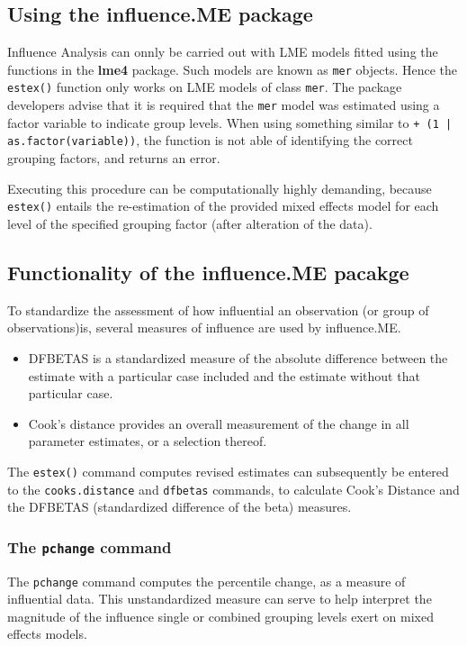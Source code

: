 \documentclass[12pt, a4paper]{article}
\begin{document}
\subsection*{Using the influence.ME package}
Influence Analysis can onnly be carried out with LME models fitted using the functions in the \textbf{lme4} package. Such models are known as \texttt{mer} objects.
Hence the \texttt{estex()} function only works on LME
models of class \texttt{mer}.
The package developers advise that it is required that the \texttt{mer} model was estimated using a factor variable to indicate group levels.
When using something similar to \texttt{+ (1 | as.factor(variable))}, the function is not able of
identifying the correct grouping factors, and returns an error.

Executing this procedure can be computationally highly demanding, because \texttt{estex()} entails the re-estimation of the provided mixed effects model for each level of the specified grouping factor (after alteration of the data).
\subsection*{Functionality of the influence.ME pacakge}
To standardize the assessment of how influential an observation (or group of observations)is, several measures
of influence are used by influence.ME.


\begin{itemize}
	\item DFBETAS is a standardized measure of the absolute difference
	between the estimate with a particular case included and the estimate without that particular
	case. 
	\item Cook’s distance provides an overall measurement of the change in all parameter
	estimates, or a selection thereof.
\end{itemize}

The \texttt{estex()} command computes revised estimates can subsequently
be entered to the \texttt{cooks.distance} and \texttt{dfbetas} commands, to calculate Cook’s Distance
and the DFBETAS (standardized difference of the beta) measures.
\subsubsection*{The \texttt{pchange} command}

The \texttt{pchange} command computes the percentile change, as a measure of influential data. This unstandardized measure can
serve to help interpret the magnitude of the influence single or combined grouping levels exert on
mixed effects models. 
\end{document}
